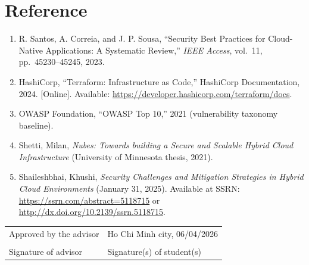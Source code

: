 \section*{Reference}

\begin{enumerate}
    \item R. Santos, A. Correia, and J. P. Sousa, ``Security Best Practices for Cloud-Native
    Applications: A Systematic Review,'' \textit{IEEE Access}, vol.~11, pp.~45230--45245, 2023.
    \item HashiCorp, ``Terraform: Infrastructure as Code,'' HashiCorp Documentation, 2024. [Online].
    Available: \url{https://developer.hashicorp.com/terraform/docs}.
    \item OWASP Foundation, ``OWASP Top 10,'' 2021 (vulnerability taxonomy baseline).
    \item Shetti, Milan, \textit{Nubes: Towards building a Secure and Scalable Hybrid Cloud
    Infrastructure} (University of Minnesota thesis, 2021).
    \item Shaileshbhai, Khushi, \textit{Security Challenges and Mitigation Strategies in Hybrid Cloud
    Environments} (January 31, 2025). Available at SSRN: \url{https://ssrn.com/abstract=5118715} or
    \url{http://dx.doi.org/10.2139/ssrn.5118715}.
\end{enumerate}

\bigskip
\begin{tabular}{@{}L{7.5cm}L{7.5cm}@{}}
Approved by the advisor & Ho Chi Minh city, 06/04/2026 \\[24pt]
\hrulefill & \hrulefill \\
Signature of advisor & Signature(s) of student(s) \\
\end{tabular}